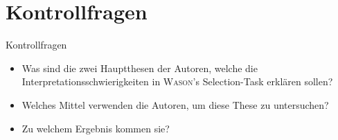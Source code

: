 
\section{Kontrollfragen}

\begin{frame}{Kontrollfragen}
    \begin{itemize}
        \item Was sind die zwei Hauptthesen der Autoren, welche die Interpretationsschwierigkeiten
            in \textsc{Wason}'s Selection-Task erklären sollen?
        \item Welches Mittel verwenden die Autoren, um diese These zu untersuchen?
        \item Zu welchem Ergebnis kommen sie?
    \end{itemize}
\end{frame}
